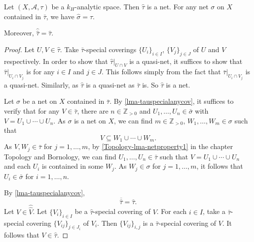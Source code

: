 \begin{proposition}\label{prop-tauhatbasic}
    Let  $(X,\mathcal{A},\tau)$ be a $k_H$-analytic space. Then $\hat{\tau}$ is a net. For any net $\sigma$ on $X$ contained in $\bar{\tau}$, we have $\hat{\sigma}=\hat{\tau}$.

    Moreover, $\hat{\hat{\tau}}=\hat{\tau}$.
\end{proposition}
\begin{proof}
    Let $U,V\in \hat{\tau}$. Take $\bar{\tau}$-special coverings $\{U_i\}_{i\in I}$, $\{V_j\}_{j\in J}$ of $U$ and $V$ respectively. In order to show that $\hat{\tau}|_{U\cap V}$ is a quasi-net, it suffices to show that $\hat{\tau}|_{U_i\cap V_j}$ is for any $i\in I$ and $j\in J$. This follows simply from the fact that $\bar{\tau}|_{U_i\cap V_j}$ is a quasi-net. Similarly, as $\hat{\tau}$ is a quasi-net as $\bar{\tau}$ is. So $\hat{\tau}$ is a net.

    Let $\sigma$ be a net on $X$ contained in $\bar{\tau}$. By \cref{lma-tauspecialanycov}, it suffices to verify that for any $V\in \bar{\tau}$, there are $n\in \mathbb{Z}_{>0}$ and $U_1,\ldots,U_n\in \bar{\sigma}$ with $V=U_1\cup \cdots \cup U_n$. As $\sigma$ is a net on $X$, we can find $m\in \mathbb{Z}_{>0}$, $W_1,\ldots,W_m\in \sigma$ such that
    \[
        V\subseteq W_1\cup \cdots\cup W_m.  
    \]
    As $V,W_j\in \bar{\tau}$ for $j=1,\ldots,m$, by \cref{Topology-lma-netproperty1} in the chapter Topology and Bornology, we can find $U_1,\ldots,U_n\in \bar{\tau}$ such that $V=U_1\cup\cdots\cup U_n$ and each $U_i$ is contained in some $W_j$. As $W_j\in \sigma$ for $j=1,\ldots,m$, it follows that $U_i\in \bar{\sigma}$ for $i=1,\ldots,n$.

    By \cref{lma-tauspecialanycov}, 
    \[
      \overline{\hat{\tau}} =\hat{\tau}. 
    \]
    Let $V\in \hat{\hat{V}}$.
    Let $\{V_i\}_{i\in I}$ be a $\hat{\tau}$-special covering of $V$. For each $i\in I$, take a $\bar{\tau}$-special covering $\{V_{ij}\}_{j\in J_i}$ of $V_i$. Then $\{V_{ij}\}_{i,j}$ is a $\bar{\tau}$-special covering of $V$. It follows that $V\in \hat{\tau}$.
\end{proof}

